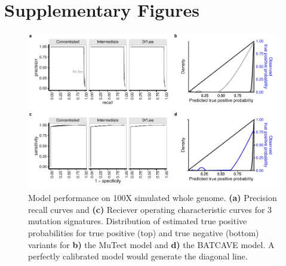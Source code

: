 
\section{Supplementary Figures}


\begin{figure}
  \begin{center}
  \includegraphics{figures/fig_wgs.pdf}
  \end{center}
  \caption{Model performance on 100X simulated whole genome.
  \textbf{(a)} Precision recall curves and \textbf{(c)} Reciever operating characteristic curves for 3 mutation signatures.
  Distribution of estimated true positive probabilities for true positive (top) and true negative (bottom) variants for \textbf{b)} the MuTect model and \textbf{d)} the BATCAVE model.
  A perfectly calibrated model would generate the diagonal line.}
\label{NAR-wgs_fig}
\end{figure}

